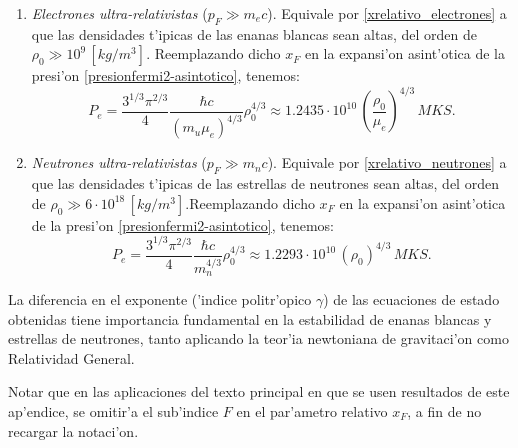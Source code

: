 \begin{enumerate}
\begin{enumerate}
\item \emph{Electrones ultra-relativistas} ($p_F\gg m_{e}c$). Equivale por  \eqref{xrelativo_electrones} a que las densidades t'ipicas de las enanas blancas sean altas, del orden de $\rho_0\gg10^{9}\,[kg/m^3]$. Reemplazando dicho $x_F$ en la expansi'on asint'otica de la presi'on \eqref{presionfermi2-asintotico}, tenemos:
\begin{equation}\label{fermi_relativista}
 \boxed{P_e=\frac{3^{1/3}\pi^{2/3}}{4}\frac{\hbar c}{(m_u\mu_e)^{4/3}}\rho_0^{4/3}\approx1.2435\cdot 10^{10}\,\left(\frac{\rho_0}{\mu_e}\right)^{4/3}\,MKS.}
\end{equation}

\item \emph{Neutrones ultra-relativistas} ($p_F\gg m_{n}c$). Equivale por  \eqref{xrelativo_neutrones} a que las densidades t'ipicas de las estrellas de neutrones sean altas, del orden de $\rho_0\gg6\cdot10^{18}\,[kg/m^3]$.Reemplazando dicho $x_F$ en la expansi'on asint'otica de la presi'on \eqref{presionfermi2-asintotico}, tenemos:
\begin{equation}\label{fermi_relativista2}
 \boxed{P_e=\frac{3^{1/3}\pi^{2/3}}{4}\frac{\hbar c}{m_n^{4/3}}\rho_0^{4/3}\approx1.2293\cdot 10^{10}\,\left(\rho_0\right)^{4/3}\,MKS.}
\end{equation}

\end{enumerate}
\end{enumerate}

La diferencia en el exponente ('indice politr'opico $\gamma$) de las ecuaciones de estado obtenidas tiene importancia fundamental en la estabilidad de enanas blancas y estrellas de neutrones, tanto aplicando la teor'ia newtoniana de gravitaci'on como Relatividad General.

Notar que en las aplicaciones del texto principal en que se usen resultados de este ap'endice, se omitir'a el sub'indice $F$ en el par'ametro relativo $x_F$, a fin de no recargar la notaci'on.